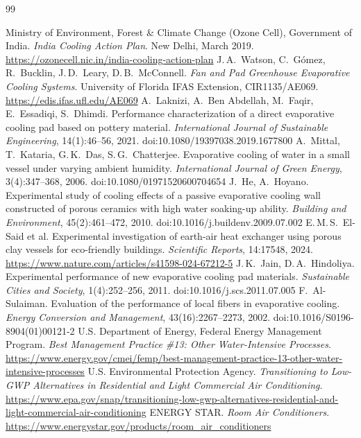 \documentclass[11pt,a4paper]{report}
\begin{document}
\begin{thebibliography}{99}
 Ministry of Environment, Forest \& Climate Change (Ozone Cell), Government of India. \emph{India Cooling Action Plan}. New Delhi, March 2019. \url{https://ozonecell.nic.in/india-cooling-action-plan}
 J.\,A.~Watson, C.~G\'omez, R.~Bucklin, J.\,D.~Leary, D.\,B.~McConnell. \emph{Fan and Pad Greenhouse Evaporative Cooling Systems}. University of Florida IFAS Extension, CIR1135/AE069. \url{https://edis.ifas.ufl.edu/AE069}
 A.~Laknizi, A.~Ben Abdellah, M.~Faqir, E.~Essadiqi, S.~Dhimdi. Performance characterization of a direct evaporative cooling pad based on pottery material. \emph{International Journal of Sustainable Engineering}, 14(1):46--56, 2021. doi:10.1080/19397038.2019.1677800
 A.~Mittal, T.~Kataria, G.\,K.~Das, S.\,G.~Chatterjee. Evaporative cooling of water in a small vessel under varying ambient humidity. \emph{International Journal of Green Energy}, 3(4):347--368, 2006. doi:10.1080/01971520600704654
 J.~He, A.~Hoyano. Experimental study of cooling effects of a passive evaporative cooling wall constructed of porous ceramics with high water soaking-up ability. \emph{Building and Environment}, 45(2):461--472, 2010. doi:10.1016/j.buildenv.2009.07.002
 E.\,M.\,S.~El-Said et al. Experimental investigation of earth-air heat exchanger using porous clay vessels for eco-friendly buildings. \emph{Scientific Reports}, 14:17548, 2024. \url{https://www.nature.com/articles/s41598-024-67212-5}
 J.\,K.~Jain, D.\,A.~Hindoliya. Experimental performance of new evaporative cooling pad materials. \emph{Sustainable Cities and Society}, 1(4):252--256, 2011. doi:10.1016/j.scs.2011.07.005
 F.~Al-Sulaiman. Evaluation of the performance of local fibers in evaporative cooling. \emph{Energy Conversion and Management}, 43(16):2267--2273, 2002. doi:10.1016/S0196-8904(01)00121-2
 U.S. Department of Energy, Federal Energy Management Program. \emph{Best Management Practice \#13: Other Water-Intensive Processes}. \url{https://www.energy.gov/cmei/femp/best-management-practice-13-other-water-intensive-processes}
 U.S. Environmental Protection Agency. \emph{Transitioning to Low-GWP Alternatives in Residential and Light Commercial Air Conditioning}. \url{https://www.epa.gov/snap/transitioning-low-gwp-alternatives-residential-and-light-commercial-air-conditioning}
 ENERGY STAR. \emph{Room Air Conditioners}. \url{https://www.energystar.gov/products/room_air_conditioners}

\end{thebibliography}
\end{document}
